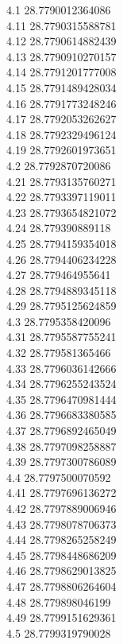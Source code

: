 {4.1	28.7790012364086\\
4.11	28.7790315588781\\
4.12	28.7790614882439\\
4.13	28.7790910270157\\
4.14	28.7791201777008\\
4.15	28.7791489428034\\
4.16	28.7791773248246\\
4.17	28.7792053262627\\
4.18	28.7792329496124\\
4.19	28.7792601973651\\
4.2	28.7792870720086\\
4.21	28.7793135760271\\
4.22	28.7793397119011\\
4.23	28.7793654821072\\
4.24	28.779390889118\\
4.25	28.7794159354018\\
4.26	28.7794406234228\\
4.27	28.779464955641\\
4.28	28.7794889345118\\
4.29	28.7795125624859\\
4.3	28.7795358420096\\
4.31	28.7795587755241\\
4.32	28.779581365466\\
4.33	28.7796036142666\\
4.34	28.7796255243524\\
4.35	28.7796470981444\\
4.36	28.7796683380585\\
4.37	28.7796892465049\\
4.38	28.7797098258887\\
4.39	28.7797300786089\\
4.4	28.7797500070592\\
4.41	28.7797696136272\\
4.42	28.7797889006946\\
4.43	28.7798078706373\\
4.44	28.7798265258249\\
4.45	28.7798448686209\\
4.46	28.7798629013825\\
4.47	28.7798806264604\\
4.48	28.779898046199\\
4.49	28.7799151629361\\
4.5	28.7799319790028\\
}
